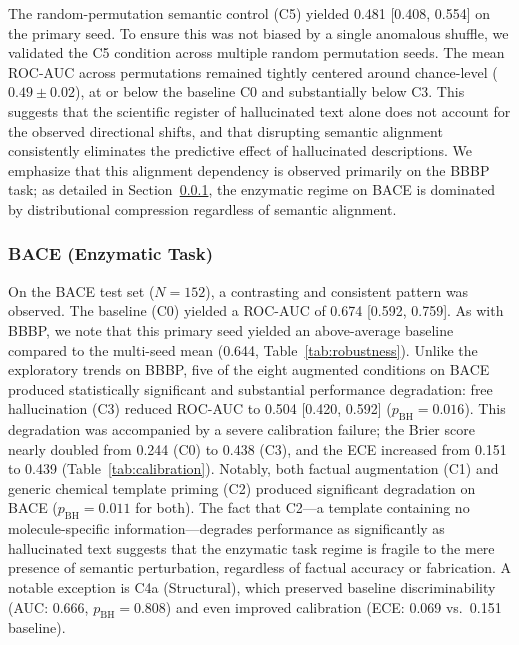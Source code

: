 The random-permutation semantic control (C5) yielded 0.481 [0.408, 0.554] on the primary seed. To ensure this was not biased by a single anomalous shuffle, we validated the C5 condition across multiple random permutation seeds. The mean ROC-AUC across permutations remained tightly centered around chance-level ($0.49 \pm 0.02$), at or below the baseline C0 and substantially below C3. This suggests that the scientific register of hallucinated text alone does not account for the observed directional shifts, and that disrupting semantic alignment consistently eliminates the predictive effect of hallucinated descriptions. We emphasize that this alignment dependency is observed primarily on the BBBP task; as detailed in Section~\ref{sec:results_bace}, the enzymatic regime on BACE is dominated by distributional compression regardless of semantic alignment.

\subsubsection{BACE (Enzymatic Task)}
\label{sec:results_bace}
On the BACE test set ($N=152$), a contrasting and consistent pattern was observed. The baseline (C0) yielded a ROC-AUC of 0.674 [0.592, 0.759]. As with BBBP, we note that this primary seed yielded an above-average baseline compared to the multi-seed mean (0.644, Table~\ref{tab:robustness}). Unlike the exploratory trends on BBBP, five of the eight augmented conditions on BACE produced statistically significant and substantial performance degradation: free hallucination (C3) reduced ROC-AUC to 0.504 [0.420, 0.592] ($p_{\text{BH}} = 0.016$). This degradation was accompanied by a severe calibration failure; the Brier score nearly doubled from 0.244 (C0) to 0.438 (C3), and the ECE increased from 0.151 to 0.439 (Table~\ref{tab:calibration}). Notably, both factual augmentation (C1) and generic chemical template priming (C2) produced significant degradation on BACE ($p_{\text{BH}} = 0.011$ for both). The fact that C2---a template containing no molecule-specific information---degrades performance as significantly as hallucinated text suggests that the enzymatic task regime is fragile to the mere presence of semantic perturbation, regardless of factual accuracy or fabrication. A notable exception is C4a (Structural), which preserved baseline discriminability (AUC: 0.666, $p_{\text{BH}} = 0.808$) and even improved calibration (ECE: 0.069 vs.\ 0.151 baseline).

